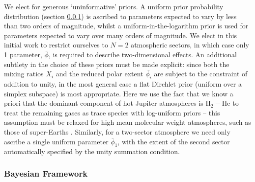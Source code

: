 \documentclass[fleqn,usenatbib]{mnras}
\begin{document}
We elect for generous `uninformative' priors. A uniform prior probability distribution (section \ref{subsubsec:Bayesian_stats}) is ascribed to parameters expected to vary by less than two orders of magnitude, whilst a uniform-in-the-logarithm prior is used for parameters expected to vary over many orders of magnitude. We elect in this initial work to restrict ourselves to $N=2$ atmospheric sectors, in which case only 1 parameter, $\bar{\phi}$, is required to describe two-dimensional effects. An additional subtlety in the choice of these priors must be made explicit: since both the mixing ratios $X_{i}$ and the reduced polar extent $\bar{\phi_{i}}$ are subject to the constraint of addition to unity, in the most general case a flat Dirchlet prior (uniform over a simplex subspace) is most appropriate. Here we use the fact that we know a priori that the dominant component of hot Jupiter atmospheres is $\mathrm{H}_{2}-\mathrm{He}$ to treat the remaining gases as trace species with log-uniform priors -- this assumption must be relaxed for high mean molecular weight atmospheres, such as those of super-Earths \citep{Benneke2012}. Similarly, for a two-sector atmosphere we need only ascribe a single uniform parameter $\bar{\phi}_{1}$, with the extent of the second sector automatically specified by the unity summation condition.

\subsubsection{Bayesian Framework}\label{subsubsec:Bayesian_stats}
\end{document}
